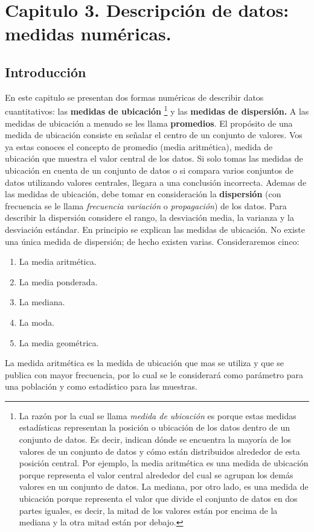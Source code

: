 \documentclass[]{article}
\begin{document}
\section{Capitulo 3. Descripción de datos: medidas numéricas.}
\subsection{Introducción}
En este capitulo se presentan dos formas numéricas de describir datos cuantitativos: las \textbf{medidas de ubicación} 
\footnote{La razón por la cual se llama \textit{medida de ubicación} es porque estas medidas estadísticas representan la posición o ubicación de los datos dentro de un conjunto de datos. Es decir, indican dónde se encuentra la mayoría de los valores de un conjunto de datos y cómo están distribuidos alrededor de esta posición central. Por ejemplo, la media aritmética es una medida de ubicación porque representa el valor central alrededor del cual se agrupan los demás valores en un conjunto de datos. La mediana, por otro lado, es una medida de ubicación porque representa el valor que divide el conjunto de datos en dos partes iguales, es decir, la mitad de los valores están por encima de la mediana y la otra mitad están por debajo.}
y las \textbf{medidas de dispersión.} A las medidas de ubicación a menudo se les llama \textbf{promedios}. El propósito de una medida de ubicación consiste en señalar el centro de un conjunto de valores. Vos ya estas conoces el concepto de promedio (media aritmética), medida de ubicación que muestra el valor central de los datos. Si solo tomas las medidas de ubicación en cuenta de un conjunto de datos o si compara varios conjuntos de datos utilizando valores centrales, llegara a una conclusión incorrecta. Ademas de las medidas de ubicación, debe tomar en consideración la \textbf{dispersión} (con frecuencia se le llama \textit{frecuencia variación }o \textit{propagación}) de los datos. Para describir la dispersión considere el rango, la desviación media, la varianza y la desviación estándar. En principio se explican las medidas de ubicación. No existe una única medida de dispersión; de hecho existen varias. Consideraremos cinco:
\begin{enumerate}
	\item La media aritmética.
	\item La media ponderada.
	\item La mediana.
	\item La moda.
	\item La media geométrica.
\end{enumerate}
La medida aritmética es la medida de ubicación que mas se utiliza y que se publica con mayor frecuencia, por lo cual se le considerará como parámetro para una población y como estadístico para las muestras.
\end{document}
